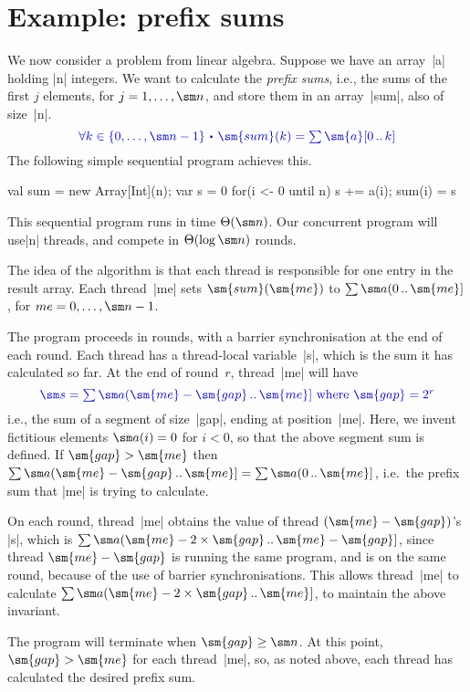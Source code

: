 \section{Example: prefix sums}

\def\revint#1#2{(#1 \upto #2]}

We now consider a problem from linear algebra.  Suppose we have an array~|a|
holding |n| integers.  We want to calculate the \emph{prefix sums}, i.e., the
sums of the first $j$ elements, for $j = 1, \ldots, \sm n$, and store them in
an array~|sum|, also of size~|n|.  
\[\mstyle
\forall k \in \set{0, \ldots, \sm n-1} \spot 
  \sm{sum}(k) = \textstyle\sum \sm{a}[0 \upto k] 
\]
The following simple sequential program achieves this.
\begin{scala}
  val sum = new Array[Int](n); var s = 0
  for(i <- 0 until n){ s += a(i); sum(i) = s }
\end{scala}
%
This sequential program runs in time $\Theta(\sm n)$.  Our concurrent program
will use|n| threads, and compete in $\Theta(\log \sm n)$ rounds. 

The idea of the algorithm is that each thread is responsible for one entry in
the result array.  Each thread~|me| sets $\sm{sum}(\sm{me})$ to $\sum \sm
a\revint{0}{\sm{me}}$, for $me = 0,\ldots,\sm n-1$.

The program proceeds in rounds, with a barrier synchronisation at the end of
each round.  Each thread has a thread-local variable~|s|, which is the sum it
has calculated so far.  At the end of round~$r$, thread~|me| will have
\[\mstyle
\sm s = \textstyle\sum \sm a(\sm{me}-\sm{gap} \upto \sm{me}]
   \mbox{ where } \sm{gap} = 2^r
\]
i.e., the sum of a segment of size~|gap|, ending at position~|me|.  Here, we
invent fictitious elements $\sm a(i) = 0$ for $i < 0$, so that the above
segment sum is defined.  If $\sm{gap} > \sm{me}$ then $\sum \sm
a\revint{\sm{me}-\sm{gap}}{\sm{me}} = \sum \sm a\revint{0}{\sm{me}}$, i.e.~the
prefix sum that |me| is trying to calculate.

On each round, thread~|me| obtains the value of thread $(\sm{me}-\sm{gap})$'s
|s|, which is $\sum \sm a\revint{\sm{me}-2 \times
  \sm{gap}}{\sm{me}-\sm{gap}}$, since thread $\sm{me}-\sm{gap}$ is running the
same program, and is on the same round, because of the use of barrier
synchronisations.  This allows thread~|me| to calculate $\sum \sm
a\revint{\sm{me}-2 \times \sm{gap}}{\sm{me}}$, to maintain the above
invariant.

The program will terminate when $\sm{gap} \ge \sm n$.  At this point,
$\sm{gap} > \sm{me}$ for each thread~|me|, so, as noted above, each thread has
calculated the desired prefix sum. 



